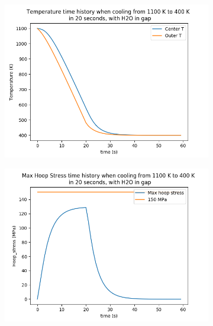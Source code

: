 \documentclass[12pt]{article}
\begin{document}
\begin{itemize}
\begin{figure}[h]
    \begin{subfigure}[b]{0.4\textwidth}
        \includegraphics[width=\textwidth]{cool_20s_H2O_T_vs_t.png}
        \caption{}
        \label{fig:t750}
    \end{subfigure}
        \begin{subfigure}[b]{0.4\textwidth}
        \includegraphics[width=\textwidth]{cool_20s_H2O_stress_vs_t.png}
        \caption{}
        \label{fig:t1000}
    \end{subfigure}
\end{figure}
\end{itemize}
\pagebreak
\end{document}
